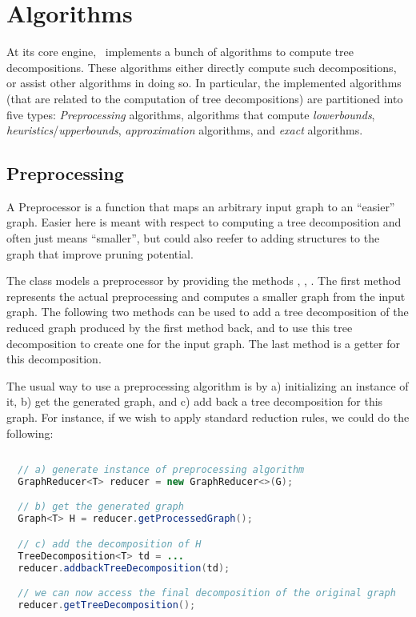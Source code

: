 \documentclass[a4paper, ukenglish, twoside, openright]{jdrasilmanual}
\begin{document}
\part{Algorithms}
At its core engine, \Jdrasil\ implements a bunch of algorithms to
compute tree decompositions. These algorithms either directly compute
such decompositions, or assist other algorithms in doing so. In
particular, the implemented algorithms (that are related to the
computation of tree decompositions) are partitioned into five types:
\emph{Preprocessing} algorithms, algorithms that compute
\emph{lowerbounds}, \emph{heuristics}/\emph{upperbounds}, \emph{approximation}
algorithms, and \emph{exact} algorithms.

\chapter{Preprocessing}
A Preprocessor is a function that maps an arbitrary input graph to an
``easier'' graph.  Easier here is meant with respect to computing a tree
decomposition and often just means ``smaller'', but could also reefer to
adding structures to the graph that improve pruning potential.
 
The class  models a preprocessor by providing the methods
 , ,
. The first method represents the
actual preprocessing and computes a smaller graph from the input
graph.  The following two methods can be used to add a tree
decomposition of the reduced graph produced by the first method back,
and to use this tree decomposition to create one for the input
graph. The last method is a getter for this decomposition.

The usual way to use a preprocessing algorithm is by a) initializing an
instance of it, b) get the generated graph, and c) add back a
tree decomposition for this graph. For instance, if we wish to
apply standard reduction rules, we could do the following:
\begin{lstlisting}[language=Java]
  
  // a) generate instance of preprocessing algorithm
  GraphReducer<T> reducer = new GraphReducer<>(G);

  // b) get the generated graph
  Graph<T> H = reducer.getProcessedGraph();

  // c) add the decomposition of H
  TreeDecomposition<T> td = ...
  reducer.addbackTreeDecomposition(td);

  // we can now access the final decomposition of the original graph
  reducer.getTreeDecomposition();
\end{lstlisting}
\end{document}
